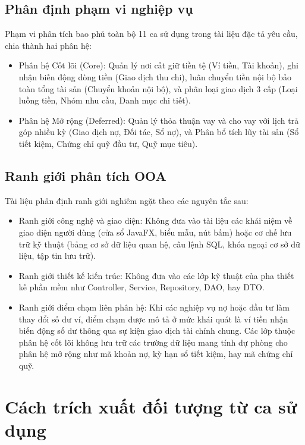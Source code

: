 \documentclass[11pt,a4paper]{article}
\begin{document}
\subsection{Phân định phạm vi nghiệp vụ}
Phạm vi phân tích bao phủ toàn bộ 11 ca sử dụng trong tài liệu đặc tả yêu cầu, chia thành hai phân hệ:
\begin{itemize}
  \item Phân hệ Cốt lõi (Core): Quản lý nơi cất giữ tiền tệ (Ví tiền, Tài khoản), ghi nhận biến động dòng tiền (Giao dịch thu chi), luân chuyển tiền nội bộ bảo toàn tổng tài sản (Chuyển khoản nội bộ), và phân loại giao dịch 3 cấp (Loại luồng tiền, Nhóm nhu cầu, Danh mục chi tiết).
  \item Phân hệ Mở rộng (Deferred): Quản lý thỏa thuận vay và cho vay với lịch trả góp nhiều kỳ (Giao dịch nợ, Đối tác, Sổ nợ), và Phân bổ tích lũy tài sản (Sổ tiết kiệm, Chứng chỉ quỹ đầu tư, Quỹ mục tiêu).
\end{itemize}

\subsection{Ranh giới phân tích OOA}
Tài liệu phân định ranh giới nghiêm ngặt theo các nguyên tắc sau:
\begin{itemize}
  \item Ranh giới công nghệ và giao diện: Không đưa vào tài liệu các khái niệm về giao diện người dùng (cửa sổ JavaFX, biểu mẫu, nút bấm) hoặc cơ chế lưu trữ kỹ thuật (bảng cơ sở dữ liệu quan hệ, câu lệnh SQL, khóa ngoại cơ sở dữ liệu, tập tin lưu trữ).
  \item Ranh giới thiết kế kiến trúc: Không đưa vào các lớp kỹ thuật của pha thiết kế phần mềm như Controller, Service, Repository, DAO, hay DTO.
  \item Ranh giới điểm chạm liên phân hệ: Khi các nghiệp vụ nợ hoặc đầu tư làm thay đổi số dư ví, điểm chạm được mô tả ở mức khái quát là ví tiền nhận biến động số dư thông qua sự kiện giao dịch tài chính chung. Các lớp thuộc phân hệ cốt lõi không lưu trữ các trường dữ liệu mang tính dự phòng cho phân hệ mở rộng như mã khoản nợ, kỳ hạn sổ tiết kiệm, hay mã chứng chỉ quỹ.
\end{itemize}

\section{Cách trích xuất đối tượng từ ca sử dụng}
\end{document}
